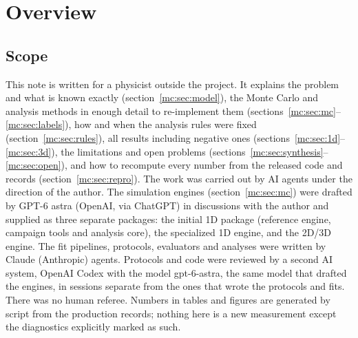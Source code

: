 \section{Overview}\label{mc:sec:overview}
\subsection{Scope}
This note is written for a physicist outside the project. It explains the problem and what is known exactly (section~\ref{mc:sec:model}), the
Monte Carlo and analysis methods in enough detail to re-implement them (sections~\ref{mc:sec:mc}--\ref{mc:sec:labels}), how and when the analysis
rules were fixed (section~\ref{mc:sec:rules}), all results including negative ones (sections~\ref{mc:sec:1d}--\ref{mc:sec:3d}), the limitations and
open problems (sections~\ref{mc:sec:synthesis}--\ref{mc:sec:open}), and how to recompute every number from the released code and records
(section~\ref{mc:sec:repro}). The work was carried out by AI agents under the direction of the author. The simulation engines (section~\ref{mc:sec:mc}) were
drafted by GPT-6 astra (OpenAI, via ChatGPT) in discussions with the author and supplied as three separate packages: the initial 1D package (reference engine, campaign tools
and analysis core), the specialized 1D engine, and the 2D/3D engine. The fit pipelines, protocols, evaluators and analyses were written by
Claude (Anthropic) agents. Protocols and code were reviewed by a second AI system, OpenAI Codex with the model gpt-6-astra, the same model that
drafted the engines, in sessions separate from the ones that wrote the protocols and fits. There was no human referee. Numbers in tables and figures are generated by script from
the production records; nothing here is a new measurement except the diagnostics explicitly marked as such.

